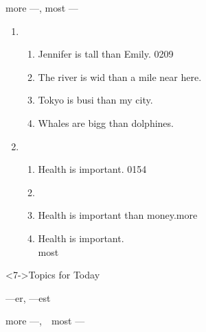 \documentclass[aspectratio=169,xcolor={dvipsnames,table}]{beamer}
\begin{document}
\begin{frame}[plain]{more ---, most ---}
\begin{enumerate}
 \item<1-> \begin{enumerate}
	\item<1-> Jennifer is tall than Emily.%
\hfill{\tiny 0209}{\scriptsize {}}
	\item<1-> The river is wid than a mile near here.
	\item<1-> Tokyo is busi than my city.
	\item<1-> Whales are bigg than dolphines.
       \end{enumerate}
 \item<2-> \begin{enumerate}
	\item<2-> Health is important.%
\hfill{\tiny 0154}\,{\scriptsize {}}
	\item<3-> \hfill{}
	\item<5-> Health is  important than money.\hfill{\scriptsize more }
	\item<6-> Health is  important.\hfill{}\\
\hfill{\scriptsize most }
       \end{enumerate}
\end{enumerate}

\begin{block}<7->{Topics for Today}
\begin{description}[第2のパターン]\small
 \item<7->[\textcolor{black}{原則:}] ---er, ---est%
	    \hfill{}
 \item<8->[\textcolor{black}{第2のパターン:}]  more ---,\,\,\,\,\,\,most ---
	    \hfill{}\\
	    \mbox{}\hspace{120pt}\visible<9->{\Circled[fill color = white]{\small \,\,比較的長い単語は第2のパターン\,\,}}
 \end{description}
     \end{block}

\end{frame}
\end{document}
